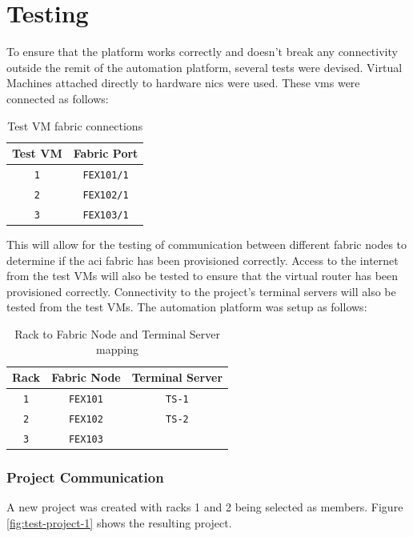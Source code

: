 \chapter{Testing}
\label{chap:testing}
To ensure that the platform works correctly and doesn't break any connectivity outside the remit of the automation platform, several tests were devised. Virtual Machines attached directly to hardware \gls{nic}s were used. These \gls{vm}s were connected as follows:

\begin{table}[htbp]
    \centering
    \begin{tabular}{@{} c c @{}}
        \toprule
        \textbf{Test VM}     & \textbf{Fabric Port} \\
        \midrule
        \texttt{1} & \texttt{FEX101/1}    \\
        \texttt{2} & \texttt{FEX102/1}    \\
        \texttt{3} & \texttt{FEX103/1}    \\
        \bottomrule
    \end{tabular}
    \caption{Test VM fabric connections}
\end{table}

This will allow for the testing of communication between different fabric nodes to determine if the \gls{aci} fabric has been provisioned correctly. Access to the internet from the test VMs will also be tested to ensure that the virtual router has been provisioned correctly. Connectivity to the project's terminal servers will also be tested from the test VMs.
The automation platform was setup as follows:

\begin{table}[htbp]
    \centering
    \begin{tabular}{@{} c c c @{}}
        \toprule
        \textbf{Rack}     & \textbf{Fabric Node} & \textbf{Terminal Server} \\
        \midrule
        \texttt{1} & \texttt{FEX101} & \texttt{TS-1}    \\
        \texttt{2} & \texttt{FEX102} & \texttt{TS-2}  \\
        \texttt{3} & \texttt{FEX103} &   \\
        \bottomrule
    \end{tabular}
    \caption{Rack to Fabric Node and Terminal Server mapping}
\end{table}


\subsection{Project Communication}
A new project was created with racks 1 and 2 being selected as members. Figure \ref{fig:test-project-1} shows the resulting project.

